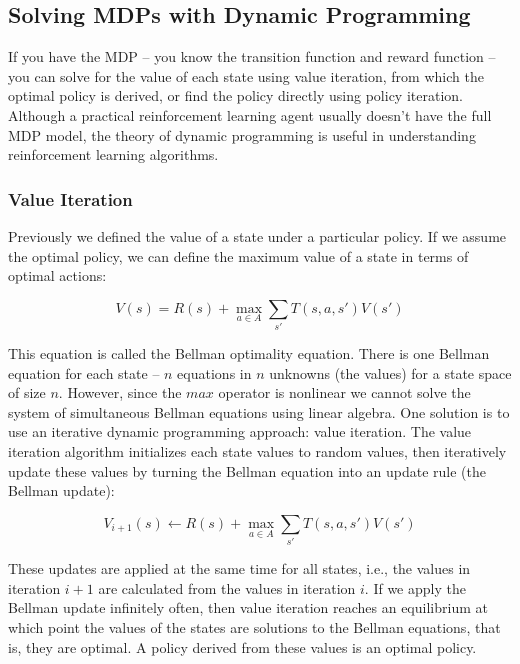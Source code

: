 \subsection{Solving MDPs with Dynamic Programming}

If you have the MDP -- you know the transition function and reward function -- you can solve for the value of each state using value iteration, from which the optimal policy is derived, or find the policy directly using policy iteration. Although a practical reinforcement learning agent usually doesn't have the full MDP model, the theory of dynamic programming is useful in understanding reinforcement learning algorithms.

\subsubsection{Value Iteration}

Previously we defined the value of a state under a particular policy. If we assume the optimal policy, we can define the maximum value of a state in terms of optimal actions:

\begin{equation}
V(s) = R(s) + \max_{a \in A} \sum_{s'} T(s, a, s') V(s')
\end{equation}

This equation is called the Bellman optimality equation. There is one Bellman equation for each state -- $n$ equations in $n$ unknowns (the values) for a state space of size $n$. However, since the $max$ operator is nonlinear we cannot solve the system of simultaneous Bellman equations using linear algebra. One solution is to use an iterative dynamic programming approach: value iteration. The value iteration algorithm initializes each state values to random values, then iteratively update these values by turning the Bellman equation into an update rule (the Bellman update):

\begin{equation}
V_{i+1}(s) \leftarrow R(s) + \max_{a \in A} \sum_{s'} T(s, a, s') V(s')
\end{equation}

These updates are applied at the same time for all states, i.e., the values in iteration $i+1$ are calculated from the values in iteration $i$. If we apply the Bellman update infinitely often, then value iteration reaches an equilibrium at which point the values of the states are solutions to the Bellman equations, that is, they are optimal. A policy derived from these values is an optimal policy.

